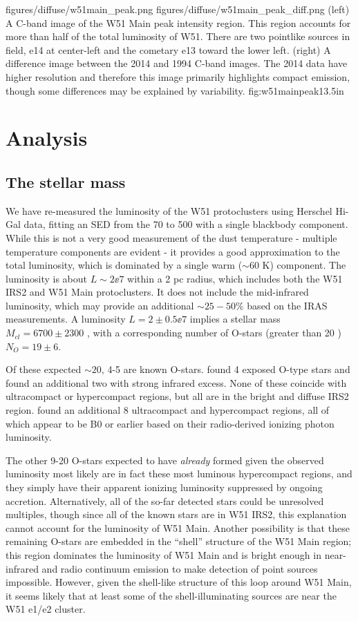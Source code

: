 \FigureTwo
{figures/diffuse/w51main_peak.png}
{figures/diffuse/w51main_peak_diff.png}
{(left) A C-band image of the W51 Main peak intensity region.  This region
accounts for more than half of the total luminosity of W51.  There are two
pointlike sources in field, e14 at center-left and the cometary e13 toward the
lower left. (right) A difference image between the 2014 and 1994 C-band images.
The 2014 data have higher resolution and therefore this image primarily
highlights compact emission, though some differences may be explained by
variability.}
{fig:w51mainpeak}{1}{3.5in}

\section{Analysis}
\subsection{The stellar mass}

We have re-measured the luminosity of the W51 protoclusters using Herschel
Hi-Gal data, fitting an SED from the 70 to 500 \um with a single blackbody
component.  While this is not a very good measurement of the dust temperature -
multiple temperature components are evident \citep{Sievers1991a} - it provides
a good approximation to the total luminosity, which is dominated by a single
warm ($\sim60$ K) component.  The luminosity is about $L\sim2\ee{7}$ \lsun
within a 2 pc radius, which includes both the W51 IRS2 and W51 Main
protoclusters.  It does not include the mid-infrared luminosity, which may
provide an additional $\sim25-50\%$ based on the IRAS measurements. A
luminosity $L=2\pm0.5\ee{7}$ \lsun implies a stellar mass $M_{cl} = 6700 \pm
2300$ \msun, with a corresponding number of O-stars (greater than 20 \msun)
$N_O = 19 \pm 6$.

Of these expected $\sim20$, 4-5 are known O-stars.  \citet{Figueredo2008a} found
4 exposed O-type stars and \citet{Barbosa2008a} found an additional two with
strong infrared excess.  None of these coincide with ultracompact or
hypercompact \hii regions, but all are in the bright and diffuse IRS2 region.
\citet{Mehringer1994a} found an additional 8 ultracompact and hypercompact \hii
regions, all of which appear to be B0 or earlier based on their radio-derived
ionizing photon luminosity.

The other 9-20 O-stars expected to have \emph{already} formed given the observed
luminosity most likely are in fact these most luminous hypercompact \hii regions,
and they simply have their apparent ionizing luminosity suppressed by ongoing
accretion.  Alternatively, all of the so-far detected stars could be unresolved
multiples, though since all of the known stars are in W51 IRS2, this
explanation cannot account for the luminosity of W51 Main.  Another possibility
is that these remaining O-stars are embedded in the ``shell'' structure of the
W51 Main region; this region dominates the luminosity of W51 Main and is bright
enough in near-infrared and radio continuum emission to make detection of point
sources impossible.  However, given the shell-like structure of this loop around
W51 Main, it seems likely that at least some of the shell-illuminating sources
are near the W51 e1/e2 cluster.

